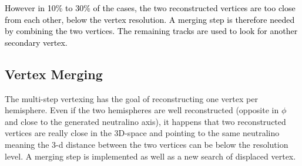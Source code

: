 \documentclass{cernatlasnote}
\begin{document}
    \textcolor{black}{However in 10\% to 30\% of the cases, the two reconstructed vertices are too close from each other, below the vertex resolution. A merging step is therefore needed by combining the two vertices. The remaining tracks are used to look for another secondary vertex.}\\
    \subsection{Vertex Merging}
        
        The multi-step vertexing has the goal of reconstructing one vertex per hemisphere. Even if the two hemispheres are well reconstructed (opposite in $\phi$ and close to the generated neutralino axis), it happens that two reconstructed vertices are really close in the 3D-space and pointing to the same neutralino meaning the 3-d distance between the two vertices can be below the resolution level. A merging step is implemented as well as a new search of displaced vertex.
\end{document}
